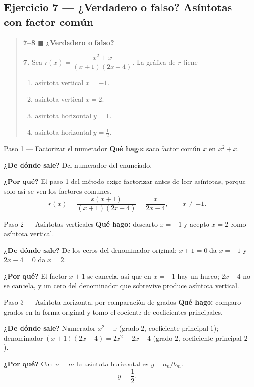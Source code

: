 \documentclass[11pt]{article}
\begin{document}
\subsection*{Ejercicio 7 — ¿Verdadero o falso? Asíntotas con factor común}

\begin{quote}
\textbf{7--8 $\blacksquare$ ¿Verdadero o falso?}

\textbf{7.} Sea $r(x)=\dfrac{x^2+x}{(x+1)(2x-4)}$. La gráfica de $r$ tiene
\begin{enumerate}[label=\emph{\alph*}\,), leftmargin=*]
\item asíntota vertical $x=-1$.
\item asíntota vertical $x=2$.
\item asíntota horizontal $y=1$.
\item asíntota horizontal $y=\tfrac12$.
\end{enumerate}
\end{quote}

\begin{paso}{Paso 1 --- Factorizar el numerador}
\textbf{Qué hago:} saco factor común $x$ en $x^2+x$.

\textbf{¿De dónde sale?} Del numerador del enunciado.

\textbf{¿Por qué?} El paso 1 del método exige factorizar antes de leer asíntotas, porque solo así se ven los factores comunes.
\[
r(x)=\frac{x(x+1)}{(x+1)(2x-4)}=\frac{x}{2x-4},\qquad x\ne -1 .
\]
\end{paso}

\begin{paso}{Paso 2 --- Asíntotas verticales}
\textbf{Qué hago:} descarto $x=-1$ y acepto $x=2$ como asíntota vertical.

\textbf{¿De dónde sale?} De los ceros del denominador original: $x+1=0$ da $x=-1$ y $2x-4=0$ da $x=2$.

\textbf{¿Por qué?} El factor $x+1$ se cancela, así que en $x=-1$ hay un hueco; $2x-4$ no se cancela, y un cero del denominador que sobrevive produce asíntota vertical.
\end{paso}

\begin{paso}{Paso 3 --- Asíntota horizontal por comparación de grados}
\textbf{Qué hago:} comparo grados en la forma original y tomo el cociente de coeficientes principales.

\textbf{¿De dónde sale?} Numerador $x^2+x$ (grado $2$, coeficiente principal $1$); denominador $(x+1)(2x-4)=2x^2-2x-4$ (grado $2$, coeficiente principal $2$).

\textbf{¿Por qué?} Con $n=m$ la asíntota horizontal es $y=a_n/b_m$.
\[
y=\frac{1}{2}.
\]
\end{paso}
\end{document}
